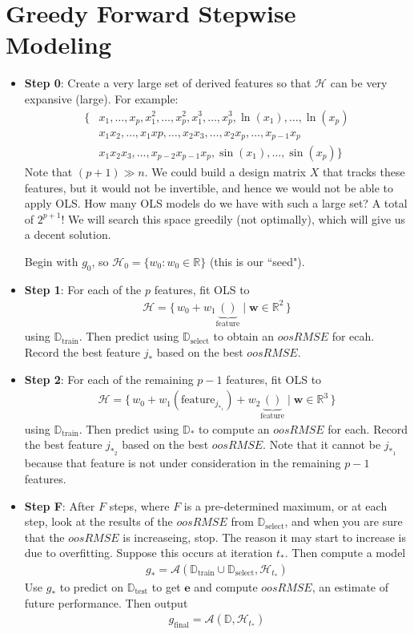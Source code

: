 \documentclass[12pt, a4paper]{article}
\theoremstyle{definition}
\newcommand{\test}{\text{test}}
\newcommand{\train}{\text{train}}
\newcommand{\select}{\text{select}}
\newcommand{\Dtest}{\mathbb{D}_{\test}}
\newcommand{\Dtrain}{\mathbb{D}_{\train}}
\newcommand{\Dselect}{\mathbb{D}_{\select}}
\begin{document}
	\section*{Greedy Forward Stepwise Modeling}
	\begin{itemize}
		\item \textbf{Step 0}: Create a very large set of derived features so
		that $\mathcal{H}$ can be very expansive (large). For example:
		\begin{align*}
			\{
			&x_1,\ldots,x_p, x_1^2,\ldots,x_p^2,x_1^3,\ldots,x_p^3,\ln(x_1),\ldots,\ln(x_p)\\
			&x_1x_2,\ldots,x_1xp,\ldots,x_2x_3,\ldots,x_2x_p,\ldots,x_{p-1}x_p\\
			&x_1x_2x_3,\ldots,x_{p-2}x_{p-1}x_{p},\sin(x_1),\ldots,\sin(x_p)
			\}
		\end{align*}
		Note that $(p+1)\gg n$. We could build a design matrix $X$ that tracks these
		features, but it would not be invertible, and hence we would not be able to
		apply OLS. How many OLS models do we have with such a large set? A total of
		$2^{p+1}$! We will search this space greedily (not optimally), which will
		give us a decent solution.
		
		Begin with $g_0$, so $\mathcal{H}_0=\{w_0:w_0\in \mathbb{R}\}$ (this is our ``seed").
		\item \textbf{Step 1}: For each of the $p$ features, fit OLS to
		\begin{align*}
			\mathcal{H} = \{\,
			w_0+w_1\underbrace{()}_{\text{feature}}\mid \bm{w}\in\mathbb{R}^2
			\,\}
		\end{align*}
		using $\Dtrain$. Then predict using $\Dselect$ to obtain an $oosRMSE$ for ecah.
		Record the best feature $j_*$ based on the best $oosRMSE$.
		\item \textbf{Step 2}: For each of the remaining $p-1$ features, fit OLS to
		\begin{align*}
			\mathcal{H} = \{\,
			w_0 + w_1(\text{feature}_{j_{*_1}}) + w_2\underbrace{()}_{\text{feature}} \mid
			\bm{w}\in\mathbb{R}^3
			\,\}
		\end{align*}
		using $\Dtrain$. Then predict using $\mathbb{D}_*$ to compute an $oosRMSE$ for
		each. Record the best feature $j_{*_2}$ based on the best $oosRMSE$.
		Note that it cannot be $j_{*_1}$ because that feature is not under consideration
		in the remaining $p-1$ features.
		\item \textbf{Step F}: After $F$ steps, where $F$ is a pre-determined maximum, or
		at each step, look at the results of the $oosRMSE$ from $\Dselect$, and when you
		are sure that the $oosRMSE$ is increaseing, stop. The reason it may start to
		increase is due to overfitting. Suppose this occurs at iteration $t_*$. Then
		compute a model
		\begin{align*}
			g_* = \mathcal{A}(\Dtrain \cup \Dselect, \mathcal{H}_{t_*})
		\end{align*}
		Use $g_*$ to predict on $\Dtest$ to get $\bm{e}$ and compute $oosRMSE$, an
		estimate of future performance. Then output
		\begin{align*}
			g_{\text{final}} = \mathcal{A}(\mathbb{D}, \mathcal{H}_{t_*})
		\end{align*}
	\end{itemize}
\end{document}
